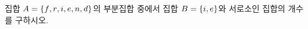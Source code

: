 집합 $A=\{f{,}\mkern3mu\mathopen{}r{,}\mkern3mu\mathopen{}i{,}\mkern3mu\mathopen{}e{,}\mkern3mu\mathopen{}n{,}\mkern3mu\mathopen{}d\}$의 부분집합 중에서 집합 $B=\{i{,}\mkern3mu\mathopen{}e\}$와 서로소인 집합의 개수를 구하시오.
